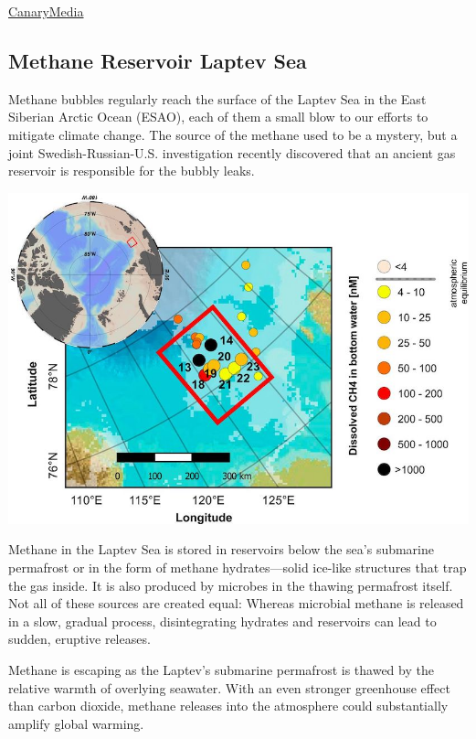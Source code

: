 \documentclass[
]{book}
\begin{document}
\href{https://www.canarymedia.com/articles/how-new-satellites-can-drive-action-against-methanes-outsize-impact-on-climate-change/}{CanaryMedia}

\hypertarget{methane-reservoir-laptev-sea}{%
\subsection{Methane Reservoir Laptev Sea}\label{methane-reservoir-laptev-sea}}

Methane bubbles regularly reach the surface of the Laptev Sea in the East Siberian Arctic Ocean (ESAO), each of them a small blow to our efforts to mitigate climate change. The source of the methane used to be a mystery, but a joint Swedish-Russian-U.S. investigation recently discovered that an ancient gas reservoir is responsible for the bubbly leaks.

\includegraphics{fig/laptev-sea-methane-map.jpg}

Methane in the Laptev Sea is stored in reservoirs below the sea's submarine permafrost or in the form of methane hydrates---solid ice-like structures that trap the gas inside. It is also produced by microbes in the thawing permafrost itself. Not all of these sources are created equal: Whereas microbial methane is released in a slow, gradual process, disintegrating hydrates and reservoirs can lead to sudden, eruptive releases.

Methane is escaping as the Laptev's submarine permafrost is thawed by the relative warmth of overlying seawater. With an even stronger greenhouse effect than carbon dioxide, methane releases into the atmosphere could substantially amplify global warming.
\end{document}
